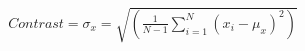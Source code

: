 \documentclass[preview]{standalone}
\begin{document}
\begin{align*}
Contrast = \sigma_x = \sqrt{\left(\frac{1}{N-1}\sum_{i=1}^{N}(x_i - \mu_x)^2\right)}
\end{align*}
\end{document}
